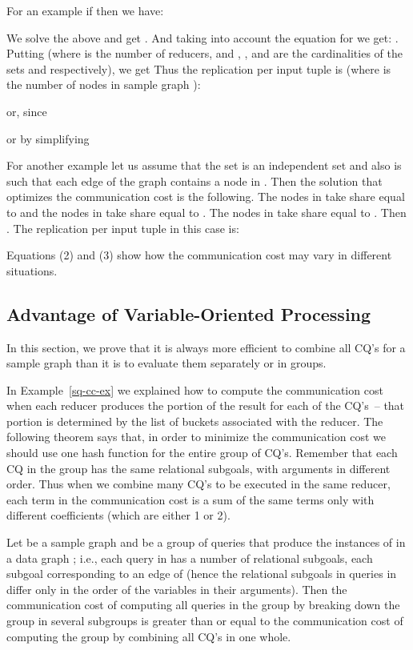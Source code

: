 \begin{example}
For an example if  then we have:


We solve the above and get . And taking into account the equation for  we get: .
Putting  (where  is the number of reducers, and , , and  are the cardinalities of the
sets   and  respectively), we get 
Thus the replication per input tuple is (where  is the number of nodes in sample graph ):



or, since 



or by simplifying


\end{example}

\begin{example}
For another example let us assume that  the set  is an independent set and also
is such that each edge
of the graph  contains a node in . Then the solution
that optimizes the communication cost is the following.
The nodes
in  take share equal to  and the nodes in
 take share equal to . The nodes in  take share equal to .
Then .
The replication per input tuple in this case is:

\end{example}
Equations (2) and (3) show how the communication cost may vary in different situations.

\subsection{Advantage of Variable-Oriented Processing}
\label{combine-app}

In this section, we prove that it is always more efficient to combine all CQ's for a sample graph than it is to evaluate them separately or in groups.


In Example~\ref{sq-cc-ex} we explained how to compute the communication cost
when each reducer produces the portion of the result for each of the CQ's~-- that
portion is determined by the list of buckets associated with the reducer.
The following theorem says that, in order to minimize the communication cost
we should use one hash function for the entire group of CQ's. Remember that
each CQ in the group has the same relational subgoals, with arguments in
different order.  Thus when we combine many CQ's to be executed in the same
reducer, each term in the communication cost is a sum of the same terms only
with different coefficients (which are either 1 or 2).

\begin{theorem}
\label{group-th}
Let  be a sample graph and  be a group of queries that produce the instances of  in a data graph ; i.e.,  each query in  has a number of relational subgoals, each subgoal corresponding to an edge of  (hence the relational subgoals in queries in  differ only in the order of the variables in their arguments).
Then the communication cost of computing all queries in the group  by breaking down the group in several subgroups is greater than or equal to the communication cost of computing the group  by combining all CQ's in one whole.
\end{theorem}

